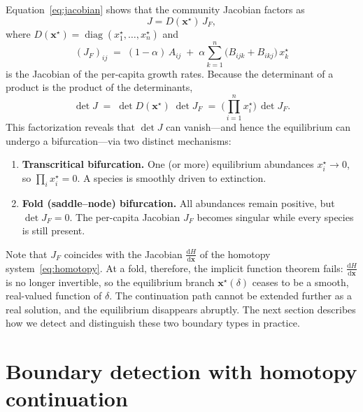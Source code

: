 \documentclass[pdflatex,sn-mathphys-num]{sn-jnl}%
\begin{document}
Equation~\eqref{eq:jacobian} shows that the community Jacobian factors as
\begin{equation}\label{eq:jac_factor}
J = D(\mathbf{x}^{\star})\,J_F,
\end{equation}
where $D(\mathbf{x}^{\star}) = \operatorname{diag}(x^{\star}_1,\ldots,x^{\star}_n)$ and
\begin{equation}\label{eq:JF_def}
(J_F)_{ij} \;=\; (1-\alpha)\,A_{ij} \;+\; \alpha\sum_{k=1}^{n}\bigl(B_{ijk}+B_{ikj}\bigr)\,x^{\star}_k
\end{equation}
is the Jacobian of the per-capita growth rates. Because the determinant of a product is the product of the determinants,
\begin{equation}\label{eq:det_factor}
\det J \;=\; \det D(\mathbf{x}^{\star})\;\det J_F \;=\; \biggl(\prod_{i=1}^{n} x^{\star}_i\biggr)\,\det J_F.
\end{equation}
This factorization reveals that $\det J$ can vanish---and hence the equilibrium can undergo a bifurcation---via two distinct mechanisms:
\begin{enumerate}
    \item \textbf{Transcritical bifurcation.} One (or more) equilibrium abundances $x^{\star}_i \to 0$, so $\prod_i x^{\star}_i = 0$. A species is smoothly driven to extinction.
    \item \textbf{Fold (saddle--node) bifurcation.} All abundances remain positive, but $\det J_F = 0$. The per-capita Jacobian $J_F$ becomes singular while every species is still present.
\end{enumerate}
Note that $J_F$ coincides with the Jacobian $\frac{\mathrm{d}H}{\mathrm{d}\mathbf{x}}$ of the homotopy system~\eqref{eq:homotopy}. At a fold, therefore, the implicit function theorem fails: $\frac{\mathrm{d}H}{\mathrm{d}\mathbf{x}}$ is no longer invertible, so the equilibrium branch $\mathbf{x}^{\star}(\delta)$ ceases to be a smooth, real-valued function of $\delta$. The continuation path cannot be extended further as a real solution, and the equilibrium disappears abruptly. The next section describes how we detect and distinguish these two boundary types in practice.

\section{Boundary detection with homotopy continuation}
\label{sec:si_homotopy}
\end{document}
